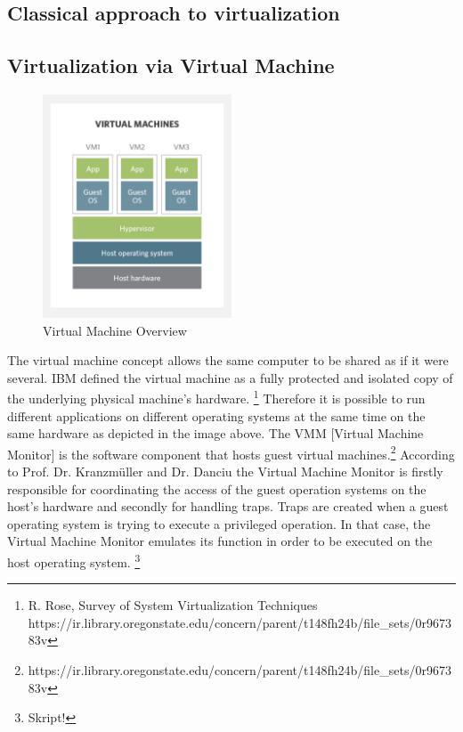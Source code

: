 \documentclass[utf8,biblatex]{lni}
\begin{document}
\subsection{Classical approach to virtualization}

\subsection{Virtualization via Virtual Machine}

\begin{figure}
  \centering
  \includegraphics[width=0.5\textwidth]{VM.pdf}
  \caption{Virtual Machine Overview}
  \label{img:vm}
\end{figure}

\glqq The virtual machine concept allows the same computer to be shared as if it were several. IBM defined the virtual machine as a fully protected and isolated copy of the underlying physical machine’s hardware. \glqq\footnote{R. Rose, \glqq Survey of System Virtualization Techniques \glqq https://ir.library.oregonstate.edu/concern/parent/t148fh24b/file_sets/0r967383v} 
Therefore it is possible to run different applications on different operating systems at the same time on the same hardware as depicted in the image above. \glqq The VMM [Virtual Machine Monitor] is the software component that hosts guest virtual machines.\glqq \footnote{https://ir.library.oregonstate.edu/concern/parent/t148fh24b/file_sets/0r967383v} According to Prof. Dr. Kranzmüller and Dr. Danciu the Virtual Machine Monitor is firstly responsible for coordinating the access of the guest operation systems on the host's hardware and secondly for handling traps. Traps are created when a guest operating system is trying to execute a privileged operation. In that case, the Virtual Machine Monitor emulates its function in order to be executed on the host operating system. \footnote{Skript!}
\end{document}
